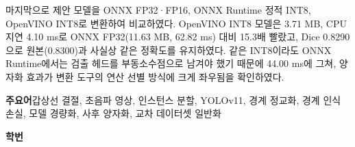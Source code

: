 마지막으로 제안 모델을 ONNX FP32·FP16, ONNX Runtime 정적 INT8, OpenVINO INT8로 변환하여 비교하였다.
OpenVINO INT8 모델은 3.71 MB, CPU 지연 4.10 ms로 ONNX FP32(11.63 MB, 62.82 ms) 대비 15.3배 빨랐고,
Dice 0.8290으로 원본(0.8300)과 사실상 같은 정확도를 유지하였다. 같은 INT8이라도 ONNX Runtime에서는
검출 헤드를 부동소수점으로 남겨야 했기 때문에 44.00 ms에 그쳐, 양자화 효과가 변환 도구의
연산 선별 방식에 크게 좌우됨을 확인하였다.

\vspace{6mm}
\noindent\textbf{주요어}\quad 갑상선 결절, 초음파 영상, 인스턴스 분할, YOLOv11, 경계 정교화,
경계 인식 손실, 모델 경량화, 사후 양자화, 교차 데이터셋 일반화

\vspace{2mm}
\noindent\textbf{학\quad 번}\quad {}
